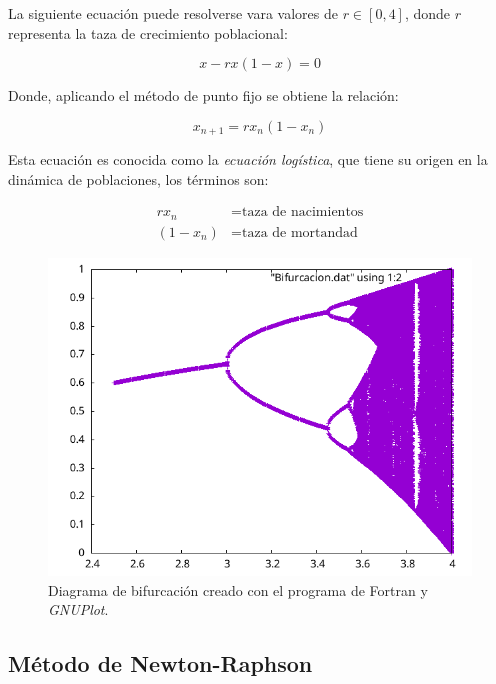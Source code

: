 \begin{ex}
    La siguiente ecuación puede resolverse vara valores de $r \in [0,4]$,
    donde $r$ representa la taza de crecimiento poblacional:

    \[
        x - rx(1 - x) = 0
    \]

    Donde, aplicando el método de punto fijo se obtiene la relación:

    \[
        x_{n+1} = r x_n (1 - x_n)
    \]

    Esta ecuación es conocida como la \emph{ecuación logística}, que tiene su
    origen en la dinámica de poblaciones, los términos son:

    \begin{align*}
        rx_n &= \text{taza de nacimientos} \\
        (1 - x_n) &= \text{taza de mortandad}
    \end{align*}

    

    \begin{figure}
        \centering
        \includegraphics[width=1.0\textwidth]{programas/bifurcacion/bifurcacion.png}
        \caption{Diagrama de bifurcación creado con el programa de
        Fortran y \textit{GNUPlot}.}
    \end{figure}
\end{ex}

\subsection{Método de Newton-Raphson}

